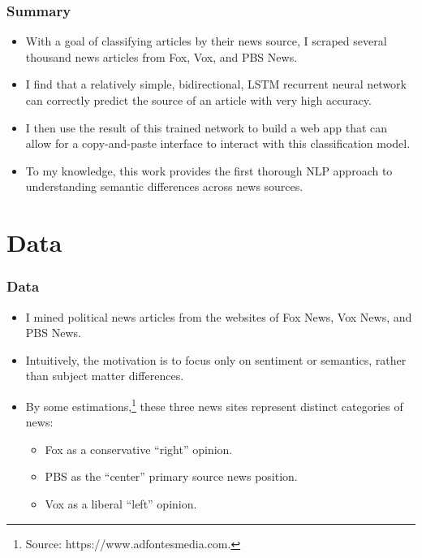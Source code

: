 \documentclass{beamer}
\begin{document}
    \begin{frame}
    	\frametitle{Summary}
    	\begin{itemize}
    		\item With a goal of classifying articles by their news source, I scraped several thousand news articles from Fox, Vox, and PBS News.
    		\item I find that a relatively simple, bidirectional, LSTM recurrent neural network can  correctly predict the source of an article with very high accuracy. 
    		\item I then use the result of this trained network to build a web app that can allow for a copy-and-paste interface to interact with this classification model. 
    		\item To my knowledge, this work provides the first thorough NLP approach to understanding semantic differences across news sources. 
    	\end{itemize}
    \end{frame}


\section{Data}

    \begin{frame}
    	\frametitle{Data}
    	\begin{itemize}
    		\item I mined political news articles from the websites of Fox News, Vox News, and PBS News. 
    		\item Intuitively, the motivation is to focus only on sentiment or semantics, rather than subject matter differences.
    		\item By some estimations,\footnote{Source: https://www.adfontesmedia.com.} these three news sites represent distinct categories of news: 
    		\begin{itemize}
    			\item Fox as a conservative “right” opinion. 
    			\item PBS as the “center” primary source news position. 
    			\item Vox as a liberal “left” opinion.
    		\end{itemize} 
    	\end{itemize}
    \end{frame}
\end{document}
